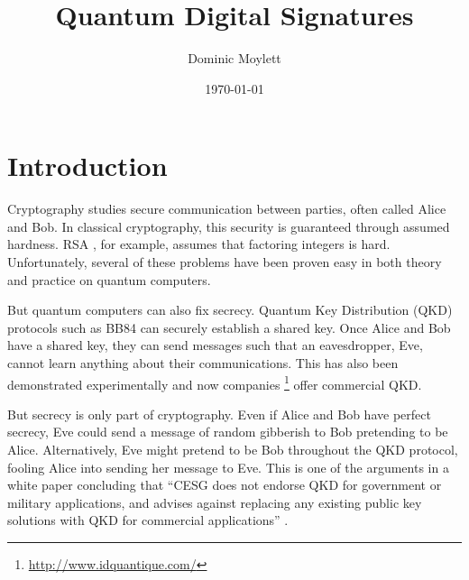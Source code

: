 \documentclass[%
 reprint,
 amsmath,amssymb,
 aps,
 pra,
]{revtex4-1}
\begin{document}
\title{Quantum Digital Signatures}

\author{Dominic Moylett}
%

\date{\today}%

\maketitle


\section{Introduction}
\label{sec:intro}

Cryptography studies secure communication between parties, often called Alice and Bob. In classical cryptography, this security is guaranteed through assumed hardness. RSA \cite{Rivest:1978:MOD:359340.359342}, for example, assumes that factoring integers is hard. Unfortunately, several of these problems have been proven easy in both theory \cite{Shor97} and practice \cite{MLL+12, 1604.05796} on quantum computers.

But quantum computers can also fix secrecy. Quantum Key Distribution (QKD) protocols such as BB84 \citep{BB84} can securely establish a shared key. Once Alice and Bob have a shared key, they can send messages such that an eavesdropper, Eve, cannot learn anything about their communications. This has also been demonstrated experimentally \cite{Bennett1992, Sibson:15} and now companies \footnote{\url{http://www.idquantique.com/}} offer commercial QKD.

But secrecy is only part of cryptography. Even if Alice and Bob have perfect secrecy, Eve could send a message of random gibberish to Bob pretending to be Alice. Alternatively, Eve might pretend to be Bob throughout the QKD protocol, fooling Alice into sending her message to Eve. This is one of the arguments in a white paper concluding that ``CESG does not endorse QKD for government or military applications, and advises against replacing any existing public key solutions with QKD for commercial applications'' \cite{CESG16}.
\end{document}
